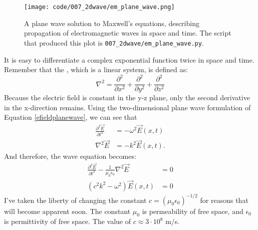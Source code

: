\begin{figure}
  \begin{center}
    \texttt{[image: code/007\_2dwave/em\_plane\_wave.png]}
  \end{center}
  \caption{A plane wave solution to Maxwell's equations, describing propagation of
    electromagnetic waves in space and time. The script that produced this
    plot is \texttt{007\_2dwave/em\_plane\_wave.py}. }
  \label{fig:planewave}
\end{figure}

It is easy to differentiate a complex exponential function twice in space and time.
Remember that the , which is a linear system, is defined as:
\begin{equation}
  \nabla^2 = \frac{\partial^2}{\partial x^2} + \frac{\partial^2}{\partial y^2} +\frac{\partial^2}{\partial z^2}
\end{equation}
Because the electric field is constant in the y-z plane, only the second derivative in
the x-direction remains. Using the two-dimensional plane wave formulation of Equation \ref{efieldplanewave}, we can see that
\begin{align}
  \frac{\partial ^2 \vec{E}}{\partial t^2} & = -\omega^2 \vec{E}(x,t) \\
  \nabla^2 \vec{E}                         & = -k^2 \vec{E}(x,t).
\end{align}
And therefore, the wave equation becomes:
\begin{align}
  \frac{\partial^2 \vec{E}}{\partial t^2} - \frac{1}{\mu_0 \epsilon_0} \nabla^2 \vec{E} & = 0                          \\
  (c^2k^2-\omega^2) \vec{E}(x,t)                                                        & = 0 \label{eq:disp_relation}
\end{align}
I've taken the liberty of changing the constant $c = (\mu_0\epsilon_0)^{-1/2}$ for
reasons that will become apparent soon.
The constant $\mu_0$ is permeability of free space, and $\epsilon_0$ is permittivity of free space.
The value of $c \approx 3\cdot 10^{8}$ m/s.

